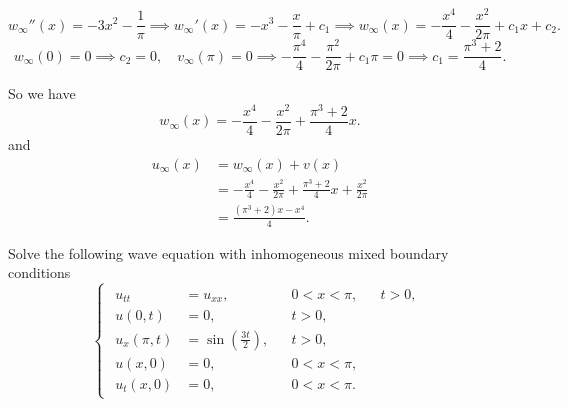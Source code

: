 \documentclass[plain]{pset}
\begin{document}
\begin{solution}
    \[w_\infty''(x) = -3x^2 - \frac{1}{\pi} \implies w_\infty'(x) = -x^3 - \frac{x}{\pi} + c_1 \implies w_\infty(x) = -\frac{x^4}{4} - \frac{x^2}{2\pi} + c_1x + c_2.\]
    \[w_\infty(0) = 0 \implies c_2 = 0, \quad v_\infty(\pi) = 0 \implies -\frac{\pi^4}{4} - \frac{\pi^2}{2\pi} + c_1\pi = 0 \implies c_1 = \frac{\pi^3  +2}{4}.\]

    So we have
    \[w_\infty(x) = -\frac{x^4}{4} - \frac{x^2}{2\pi} + \frac{\pi^3 + 2}{4}x.\]
    and
    \begin{align*}
        u_\infty(x) & = w_\infty(x) + v(x)                                                          \\
                    & = -\frac{x^4}{4} - \frac{x^2}{2\pi} + \frac{\pi^3 + 2}{4}x + \frac{x^2}{2\pi} \\
                    & = \frac{\left(\pi^3 + 2\right)x - x^4}{4}.
    \end{align*}
\end{solution}

\pagebreak

\begin{problem}
Solve the following wave equation with inhomogeneous mixed boundary conditions
\[
    \begin{cases}
        \begin{aligned}
            u_{tt}      & = u_{xx},                        &  & 0 < x < \pi, &  & t > 0, \\
            u(0, t)     & = 0,                             &  & t > 0,                   \\
            u_x(\pi, t) & = \sin\left(\frac{3t}{2}\right), &  & t > 0,                   \\
            u(x, 0)     & = 0,                             &  & 0 < x < \pi,             \\
            u_t(x, 0)   & = 0,                             &  & 0 < x < \pi.
        \end{aligned}
    \end{cases}
\]
\end{problem}
\begin{solution}

\end{solution}
\end{document}
